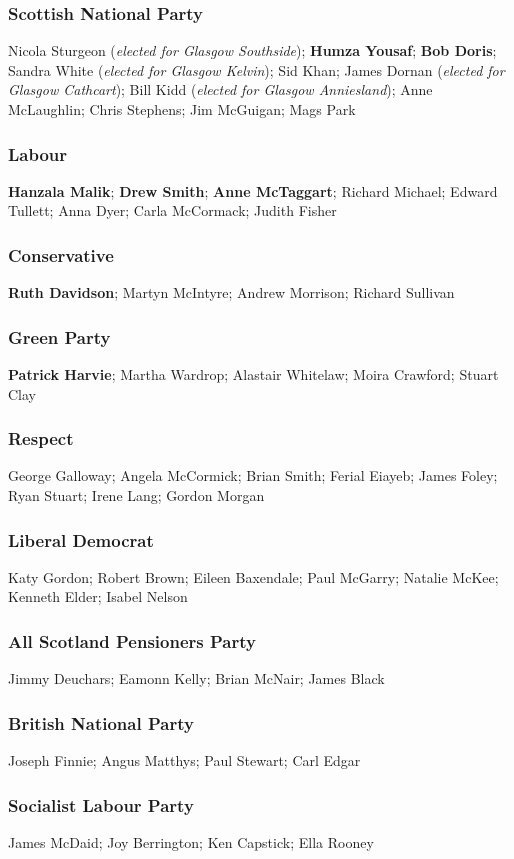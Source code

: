\begin{resultsiii}
\subsubsection*{Scottish National Party}
Nicola Sturgeon (\emph{elected for Glasgow Southside}); \textbf{Humza Yousaf}; \textbf{Bob Doris}; Sandra White (\emph{elected for Glasgow Kelvin}); Sid Khan; James Dornan (\emph{elected for Glasgow Cathcart}); Bill Kidd (\emph{elected for Glasgow Anniesland}); Anne McLaughlin; Chris Stephens; Jim McGuigan; Mags Park
\subsubsection*{Labour}
\textbf{Hanzala Malik}; \textbf{Drew Smith}; \textbf{Anne McTaggart}; Richard Michael; Edward Tullett; Anna Dyer; Carla McCormack; Judith Fisher
\subsubsection*{Conservative}
\textbf{Ruth Davidson}; Martyn McIntyre; Andrew Morrison; Richard Sullivan
\subsubsection*{Green Party}
\textbf{Patrick Harvie}; Martha Wardrop; Alastair Whitelaw; Moira Crawford; Stuart Clay
\subsubsection*{Respect}
George Galloway; Angela McCormick; Brian Smith; Ferial Eiayeb; James Foley; Ryan Stuart; Irene Lang; Gordon Morgan
\subsubsection*{Liberal Democrat}
Katy Gordon; Robert Brown; Eileen Baxendale; Paul McGarry; Natalie McKee; Kenneth Elder; Isabel Nelson
\subsubsection*{All Scotland Pensioners Party}
Jimmy Deuchars; Eamonn Kelly; Brian McNair; James Black
\subsubsection*{British National Party}
Joseph Finnie; Angus Matthys; Paul Stewart; Carl Edgar
\subsubsection*{Socialist Labour Party}
James McDaid; Joy Berrington; Ken Capstick; Ella Rooney

\end{resultsiii}
